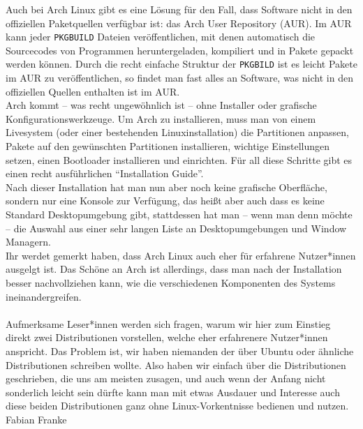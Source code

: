 {{        Auch bei Arch Linux gibt es eine Lösung für den Fall, dass Software nicht in den
        offiziellen Paketquellen verfügbar ist: das Arch User Repository (AUR).
        Im AUR kann jeder \texttt{PKGBUILD} Dateien veröffentlichen, mit denen
        automatisch die Sourcecodes von Programmen heruntergeladen, kompiliert und in
        Pakete gepackt werden können. Durch die recht einfache Struktur der
        \texttt{PKGBILD} ist es leicht Pakete im AUR zu veröffentlichen, so findet man
        fast alles an Software, was nicht in den offiziellen Quellen enthalten ist im
        AUR.\\
        Arch kommt -- was recht ungewöhnlich ist -- ohne Installer oder grafische
        Konfigurationswerkzeuge. Um Arch zu
        installieren, muss man von einem Livesystem (oder einer bestehenden
        Linuxinstallation) die Partitionen anpassen, Pakete auf den gewünschten
        Partitionen installieren, wichtige Einstellungen setzen, einen Bootloader
        installieren und einrichten.
        Für all diese Schritte gibt es einen recht ausführlichen \enquote{Installation
            Guide}.\\
        Nach dieser Installation hat man nun aber noch keine grafische Oberfläche,
        sondern nur eine Konsole zur Verfügung, das heißt aber auch dass es keine
        Standard Desktopumgebung gibt, stattdessen hat man -- wenn man denn möchte --
        die Auswahl aus einer sehr langen Liste an Desktopumgebungen und Window
        Managern.\\
        Ihr werdet gemerkt haben, dass Arch Linux auch eher für erfahrene Nutzer*innen ausgelgt
        ist. Das Schöne an Arch ist allerdings, dass man nach der Installation besser
        nachvollziehen kann, wie die verschiedenen Komponenten des Systems
        ineinandergreifen.
        \\~\\
        Aufmerksame Leser*innen werden sich fragen, warum wir hier zum Einstieg direkt
        zwei Distributionen vorstellen, welche eher erfahrenere Nutzer*innen anspricht.
        Das Problem ist, wir haben niemanden der über Ubuntu oder ähnliche
        Distributionen schreiben wollte.
        Also haben wir einfach über die Distributionen geschrieben, die uns am meisten
        zusagen, und auch wenn der Anfang nicht sonderlich leicht sein dürfte kann man
        mit etwas Ausdauer und Interesse auch diese beiden Distributionen ganz ohne
        Linux-Vorkentnisse bedienen und nutzen.
    }
    {Fabian Franke}}

\vfill
{}
\vfill

\newpage
